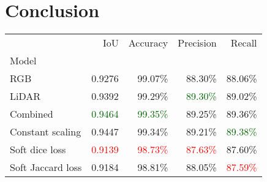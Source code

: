 \section*{Conclusion}

\begin{center}
  \begin{tabular}{lrrrr}
    \toprule
    {} &                           IoU &                       Accuracy &                      Precision &                         Recall \\
    Model             &                               &                                &                                &                                \\
    \midrule
    RGB               &                        0.9276 &                        99.07\% &                        88.30\% &                        88.06\% \\
    LiDAR             &                        0.9392 &                        99.29\% & \textcolor{darkgreen}{89.30\%} &                        89.02\% \\
    Combined          & \textcolor{darkgreen}{0.9464} & \textcolor{darkgreen}{99.35\%} &                        89.25\% &                        89.36\% \\
    Constant scaling  &                        0.9447 &                        99.34\% &                        89.21\% & \textcolor{darkgreen}{89.38\%} \\
    Soft dice loss    &       \textcolor{red}{0.9139} &       \textcolor{red}{98.73\%} &       \textcolor{red}{87.63\%} &                        87.60\% \\
    Soft Jaccard loss &                        0.9184 &                        98.81\% &                        88.05\% &       \textcolor{red}{87.59\%} \\
    \bottomrule
  \end{tabular}
\end{center}
